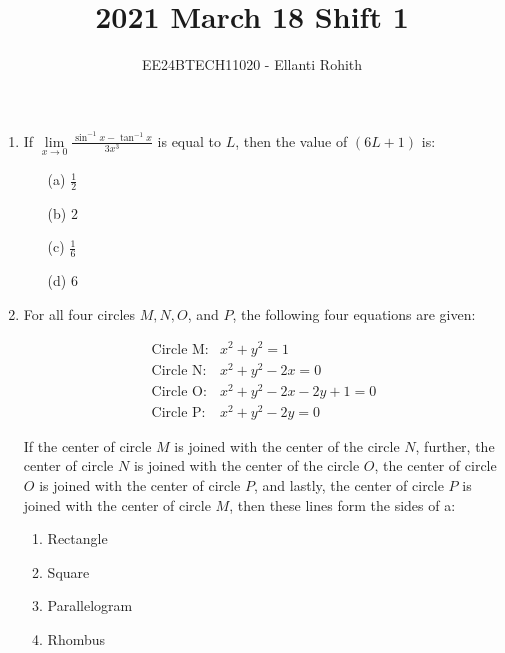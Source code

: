 \documentclass[journal,12pt,onecolumn]{IEEEtran}
\theoremstyle{remark}
\begin{document}

\vspace{3cm}

\title{2021 March 18 Shift 1}
\author{EE24BTECH11020 -  Ellanti Rohith}
\maketitle

\renewcommand{\thefigure}{\theenumi}
\renewcommand{\thetable}{\theenumi}






\begin{enumerate}



\item If $\lim\limits_{x \to 0} \frac{\sin^{-1} x - \tan^{-1} x}{3x^3}$ is equal to $L$, then the value of $(6L + 1)$ is:
\begin{multicols}{4}
\begin{enumerate}
     \item[(a)] $\frac{1}{2}$
    \item[(b)] $2$
    \item[(c)] $\frac{1}{6}$
    \item[(d)] $6$
\end{enumerate}
\end{multicols}

   
\item For all four circles $M, N, O$, and $P$, the following four equations are given:

\begin{align*}
\text{Circle M}:  &  x^2 + y^2 = 1 \\
\text{Circle N}:  &  x^2 + y^2 - 2x = 0 \\
\text{Circle O}:  &  x^2 + y^2 - 2x - 2y + 1 = 0 \\
\text{Circle P}:  &  x^2 + y^2 - 2y = 0
\end{align*}

If the center of circle $M$ is joined with the center of the circle $N$, further, the center of circle $N$ is joined with the center of the circle $O$, the center of circle $O$ is joined with the center of circle $P$, and lastly, the center of circle $P$ is joined with the center of circle $M$, then these lines form the sides of a:
\begin{multicols}{2}
\begin{enumerate}
    \item Rectangle
    \item Square
    \item Parallelogram
    \item Rhombus
\end{enumerate}
    

\end{multicols}
\end{enumerate}
\end{document}
